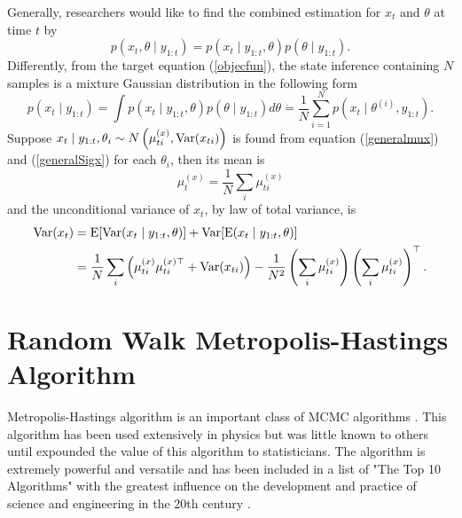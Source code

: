 Generally, researchers would like to find the combined estimation for $x_t$ and $\theta$ at time $t$ by
\begin{equation*}
p(x_t, \theta \mid y_{1:t}) = p(x_t\mid y_{1:t},\theta)p(\theta\mid y_{1:t}).
\end{equation*}
Differently, from the target equation (\ref{objecfun}), the state inference containing $N$ samples is a mixture Gaussian distribution in the following form 
\begin{equation}\label{mixtureGaussian}
p(x_t \mid y_{1:t}) = \int p(x_t\mid y_{1:t},\theta) p(\theta\mid y_{1:t})d\theta \dot{=} \frac{1}{N}\sum_{i=1}^{N}p\left(x_{t}\mid\theta^{(i)},y_{1:t}\right). 
\end{equation}
Suppose $x_t\mid y_{1:t},\theta_i \sim N\left( \mu_{ti}^{(x)},\mathrm{Var}(x_{ti}) \right)$ is found from equation (\ref{generalmux}) and (\ref{generalSigx}) for each $\theta_i$, then its mean is 
\begin{equation}\label{mixturemean}
\mu_t^{(x)} = \frac{1}{N} \sum_i \mu_{ti}^{(x)} 
\end{equation}
and  the unconditional variance of $x_t$, by law of total variance, is 
\begin{equation}\label{mixturevariance}
\begin{split}
\mathrm{Var}(x_t) &= \mathrm{E}\lbrack \mathrm{Var}(x_t\mid y_{1:t},\theta)\rbrack + \mathrm{Var}\lbrack \mathrm{E}(x_t\mid y_{1:t},\theta)\rbrack \\
&= \frac{1}{N} \sum_i \left( \mu_{ti}^{(x)}  \mu_{ti}^{(x)\top} +\mathrm{Var}(x_{ti})\right) -\frac{1}{N^2} \left(  \sum_i  \mu_{ti}^{(x)} \right) \left( \sum_i \mu_{ti}^{(x)} \right) ^\top.
\end{split}
\end{equation}

\section{Random Walk Metropolis-Hastings Algorithm}

Metropolis-Hastings algorithm is an important class of MCMC algorithms \citep{smith1993bayesian, tierney1994markov, gilks1995markov}.  This algorithm has been used extensively in physics but was little known to others until  \cite{muller1991generic, tierney1994markov} expounded the value of this algorithm to statisticians. The algorithm is extremely powerful and versatile and has been included in a list of "The Top 10 Algorithms"  with the greatest influence on the development and practice of science and engineering in the 20th century \citep{dongarra2000guest, medova2008bayesian}. 

